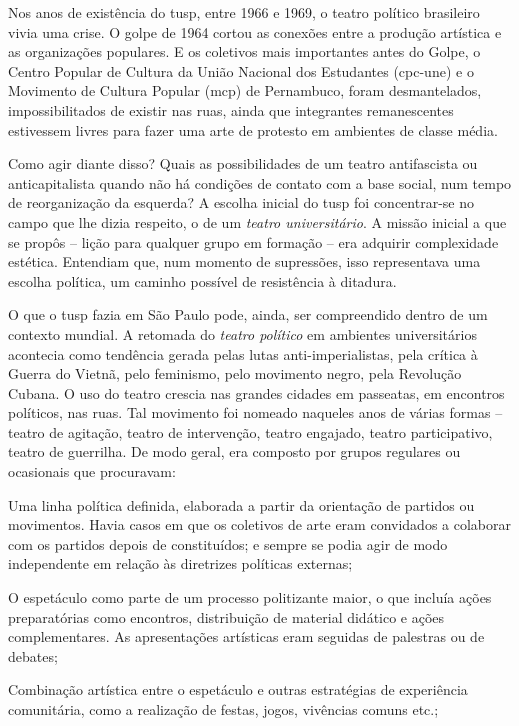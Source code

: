 Nos anos de existência do {\sc tusp}, entre 1966 e 1969, o teatro político
brasileiro vivia uma crise. O golpe de 1964 cortou as conexões entre a
produção artística e as organizações populares. E os coletivos mais
importantes antes do Golpe, o Centro Popular de Cultura da União
Nacional dos Estudantes ({\sc cpc-une}) e o Movimento de Cultura Popular ({\sc mcp})
de Pernambuco, foram desmantelados, impossibilitados de existir nas
ruas, ainda que integrantes remanescentes estivessem livres para fazer
uma arte de protesto em ambientes de classe média.

Como agir diante disso? Quais as possibilidades de um teatro
antifascista ou anticapitalista quando não há condições de contato com a
base social, num tempo de reorganização da esquerda? A escolha inicial
do {\sc tusp} foi concentrar-se no campo que lhe dizia respeito, o de um
{\it teatro universitário}. A missão inicial a que se propôs -- lição
para qualquer grupo em formação -- era adquirir complexidade estética.
Entendiam que, num momento de supressões, isso representava uma escolha
política, um caminho possível de resistência à ditadura.

O que o {\sc tusp} fazia em São Paulo pode, ainda, ser compreendido dentro de
um contexto mundial. A retomada do {\it teatro político} em ambientes
universitários acontecia como tendência gerada pelas lutas
anti-imperialistas, pela crítica à Guerra do Vietnã, pelo feminismo,
pelo movimento negro, pela Revolução Cubana. O uso do teatro crescia nas
grandes cidades em passeatas, em encontros políticos, nas ruas. Tal
movimento foi nomeado naqueles anos de várias formas -- teatro de
agitação, teatro de intervenção, teatro engajado, teatro participativo,
teatro de guerrilha. De modo geral, era composto por grupos regulares ou
ocasionais que procuravam:

\startitemize[a,packed]
\item
  Uma linha política definida, elaborada a partir da orientação de
  partidos ou movimentos. Havia casos em que os coletivos de arte eram
  convidados a colaborar com os partidos depois de constituídos; e
  sempre se podia agir de modo independente em relação às diretrizes
  políticas externas;
\item
  O espetáculo como parte de um processo politizante maior, o que
  incluía ações preparatórias como encontros, distribuição de material
  didático e ações complementares. As apresentações artísticas eram
  seguidas de palestras ou de debates;
\item
  Combinação artística entre o espetáculo e outras estratégias de
  experiência comunitária, como a realização de festas, jogos, vivências
  comuns etc.;
\stopitemize

